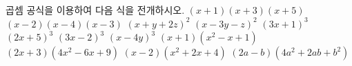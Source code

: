 곱셈 공식을 이용하여 다음 식을 전개하시오.
 $(x+1)(x+3)(x+5)$
 $(x-2)(x-4)(x-3)$
 $(x+y+2z)^2$
 $(x-3y-z)^2$
 $(3x+1)^3$
 $(2x+5)^3$
 $(3x-2)^3$
 $(x-4y)^3$
 $(x+1)(x^2-x+1)$
 $(2x+3)(4x^2-6x+9)$
 $(x-2)(x^2+2x+4)$
 $(2a-b)(4a^2+2ab+b^2)$
